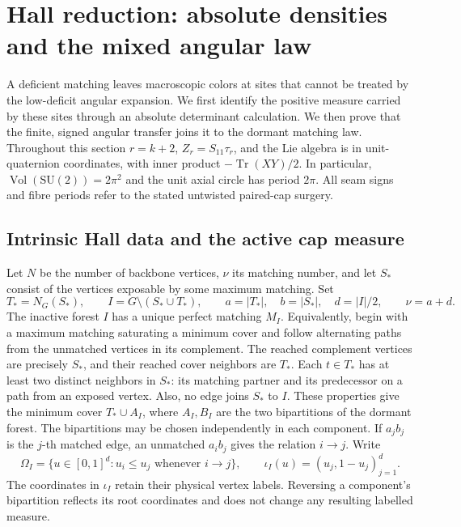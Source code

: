 \section{Hall reduction: absolute densities and the mixed angular law}
\label{sec:hall}

A deficient matching leaves macroscopic colors at sites that cannot be
treated by the low-deficit angular expansion. We first identify the positive
measure carried by these sites through an absolute determinant calculation.
We then prove that the finite, signed angular transfer joins it to the
dormant matching law. Throughout this section \(r=k+2\),
\(Z_r=S_{11}\tau_r\), and the Lie algebra is in unit-quaternion coordinates,
with inner product \(-\operatorname{Tr}(XY)/2\). In particular,
\(\operatorname{Vol}(\mathrm{SU}(2))=2\pi^2\) and the unit axial circle has
period \(2\pi\). All seam signs and fibre periods refer to the stated
untwisted paired-cap surgery.

\subsection{Intrinsic Hall data and the active cap measure}
\label{sec:hall:data}

Let \(N\) be the number of backbone vertices, \(\nu\) its matching number,
and let \(S_*\) consist of the vertices exposable by some maximum matching.
Set
\[
 T_*=N_G(S_*),\qquad I=G\setminus(S_*\cup T_*),\qquad
 a=|T_*|,\quad b=|S_*|,\quad d=|I|/2,\qquad \nu=a+d .
\]
The inactive forest \(I\) has a unique perfect matching \(M_I\).
Equivalently, begin with a maximum matching saturating a minimum cover
and follow alternating paths from the unmatched vertices in its
complement. The reached complement vertices are precisely \(S_*\), and
their reached cover neighbors are \(T_*\). Each \(t\in T_*\) has at least
two distinct neighbors in \(S_*\): its matching partner and its
predecessor on a path from an exposed vertex. Also, no edge joins \(S_*\)
to \(I\). These properties give the minimum cover \(T_*\cup A_I\), where
\(A_I,B_I\) are the two bipartitions of the dormant forest. The
bipartitions may be chosen independently in each component. If \(a_jb_j\)
is the \(j\)-th matched edge, an unmatched \(a_i b_j\) gives the relation
\(i\to j\). Write
\[
 \Omega_I=\{u\in[0,1]^d:u_i\le u_j\text{ whenever }i\to j\},\qquad
 \iota_I(u)=(u_j,1-u_j)_{j=1}^d .
\]
The coordinates in \(\iota_I\) retain their physical vertex labels.
Reversing a component's bipartition reflects its root coordinates and
does not change any resulting labelled measure.

